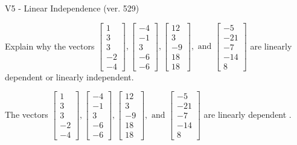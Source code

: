 \begin{exercise}
  \begin{exerciseTitle}V5 - Linear Independence (ver. 529)\end{exerciseTitle}
  \begin{exerciseStatement}
    Explain why the vectors \(\left[\begin{array}{r}
1 \\
3 \\
3 \\
-2 \\
-4
\end{array}\right] , \left[\begin{array}{r}
-4 \\
-1 \\
3 \\
-6 \\
-6
\end{array}\right] , \left[\begin{array}{r}
12 \\
3 \\
-9 \\
18 \\
18
\end{array}\right] , \text{ and } \left[\begin{array}{r}
-5 \\
-21 \\
-7 \\
-14 \\
8
\end{array}\right]\) are linearly dependent or linearly independent.	


  \end{exerciseStatement}
  \begin{exerciseAnswer}
   The vectors \(\left[\begin{array}{r}
1 \\
3 \\
3 \\
-2 \\
-4
\end{array}\right] , \left[\begin{array}{r}
-4 \\
-1 \\
3 \\
-6 \\
-6
\end{array}\right] , \left[\begin{array}{r}
12 \\
3 \\
-9 \\
18 \\
18
\end{array}\right] , \text{ and } \left[\begin{array}{r}
-5 \\
-21 \\
-7 \\
-14 \\
8
\end{array}\right]\) are 
  	 linearly dependent  .
  


  \end{exerciseAnswer}
\end{exercise}